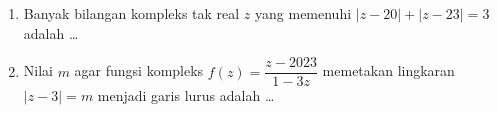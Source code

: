 \documentclass[12pt,twoside]{article}
\begin{document}
\begin{enumerate}
\begin{align*}
\begin{pmatrix}
			               \begin{bmatrix}
				      1 \\ 1 \\ 1
			      \end{bmatrix}
		               \end{pmatrix}= \begin{bmatrix}
			                              1 \\ 2 \\ 3
		                              \end{bmatrix}
	      \end{align*}
	      Nilai dari $(T-I)\circ(T-2I)\circ(T-3I)\begin{pmatrix}
			      \begin{bmatrix}
				      9 \\ 7 \\ 8
			      \end{bmatrix}
		      \end{pmatrix}$  adalah \dots
	\item Banyak bilangan kompleks tak real $z$ yang memenuhi $|z-20|+|z-23|=3$ adalah \dots
	\item Nilai $m$ agar fungsi kompleks $f(z)=\dfrac{z-2023}{1-3z}$ memetakan lingkaran $|z-3|=m$ menjadi garis lurus adalah \dots
\end{enumerate}
\end{document}
